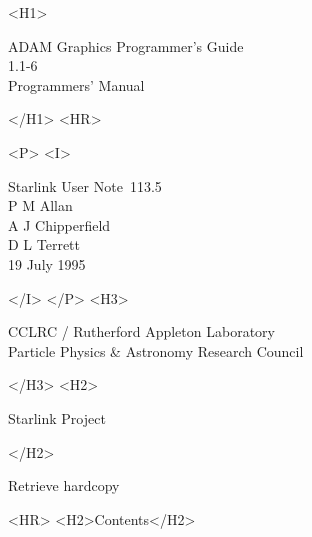 \documentclass[twoside,11pt]{article}
\newcommand{\stardoccategory}  {Starlink User Note}
\newcommand{\stardocsource}    {sun\stardocnumber}
\newcommand{\stardocnumber}    {113.5}
\newcommand{\stardocauthors}   {P M Allan\\A J Chipperfield\\D L Terrett}
\newcommand{\stardocdate}      {19 July 1995}
\newcommand{\stardoctitle}     {ADAM Graphics Programmer's Guide}
\newcommand{\stardocversion}   {1.1-6}
\newcommand{\stardocmanual}    {Programmers' Manual}
\newcommand{\htmladdnormallink}[2]{#1}
\newcommand{\htmladdimg}[1]{}
\newcommand{\htmlref}[2]{#1}
\newcommand{\htmladdtonavigation}[1]{}
\newcommand{\xlabel}[1]{}
\renewcommand{\_}{\texttt{\symbol{95}}}
\begin{document}
\begin{htmlonly}
   \xlabel{}
   \begin{rawhtml} <H1> \end{rawhtml}
      \stardoctitle\\
      \stardocversion\\
      \stardocmanual
   \begin{rawhtml} </H1> <HR> \end{rawhtml}


   \begin{rawhtml} <P> <I> \end{rawhtml}
   \stardoccategory\ \stardocnumber \\
   \stardocauthors \\
   \stardocdate
   \begin{rawhtml} </I> </P> <H3> \end{rawhtml}
      \htmladdnormallink{CCLRC / Rutherford Appleton Laboratory}
                        {http://www.cclrc.ac.uk} \\
      \htmladdnormallink{Particle Physics \& Astronomy Research Council}
                        {http://www.pparc.ac.uk} \\
   \begin{rawhtml} </H3> <H2> \end{rawhtml}
      \htmladdnormallink{Starlink Project}{http://www.starlink.ac.uk/}
   \begin{rawhtml} </H2> \end{rawhtml}
   \htmladdnormallink{\htmladdimg{source.gif} Retrieve hardcopy}
      {http://www.starlink.ac.uk/cgi-bin/hcserver?\stardocsource}\\

  \label{stardoccontents}
  \begin{rawhtml} 
    <HR>
    <H2>Contents</H2>
  \end{rawhtml}
  \htmladdtonavigation{\htmlref{\htmladdimg{contents_motif.gif}}
        {stardoccontents}}

\end{htmlonly}
\end{document}
